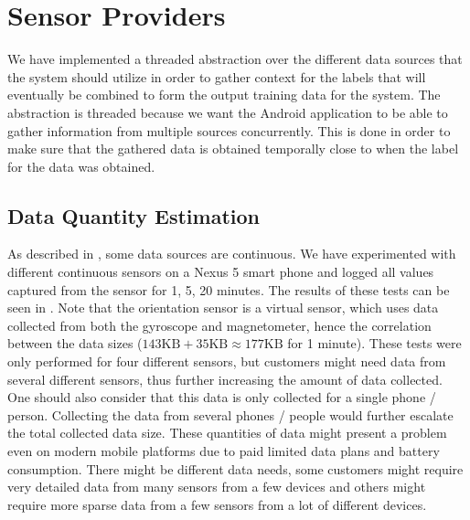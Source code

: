 
\section{Sensor Providers}
\label{sec:sensor_providers}

We have implemented a threaded abstraction over the different data sources that the system should utilize in order to gather context for the labels that will eventually be combined to form the output training data for the system. The abstraction is threaded because we want the Android application to be able to gather information from multiple sources concurrently. This is done in order to make sure that the gathered data is obtained temporally close to when the label for the data was obtained. 

\subsection{Data Quantity Estimation}
\label{sub:data_quantity_estimation}

As described in , some data sources are continuous. We have experimented with different continuous sensors on a Nexus 5 smart phone and logged all values captured from the sensor for 1, 5, 20 minutes. The results of these tests can be seen in . Note that the orientation sensor is a virtual sensor, which uses data collected from both the gyroscope and magnetometer, hence the correlation between the data sizes ($143 \text{KB} + 35 \text{KB} \approx 177 \text{KB}$ for 1 minute). These tests were only performed for four different sensors, but customers might need data from several different sensors, thus further increasing the amount of data collected. One should also consider that this data is only collected for a single phone / person. Collecting the data from several phones / people would further escalate the total collected data size. These quantities of data might present a problem even on modern mobile platforms due to paid limited data plans and battery consumption. There might be different data needs, some customers might require very detailed data from many sensors from a few devices and others might require more sparse data from a few sensors from a lot of different devices. 

